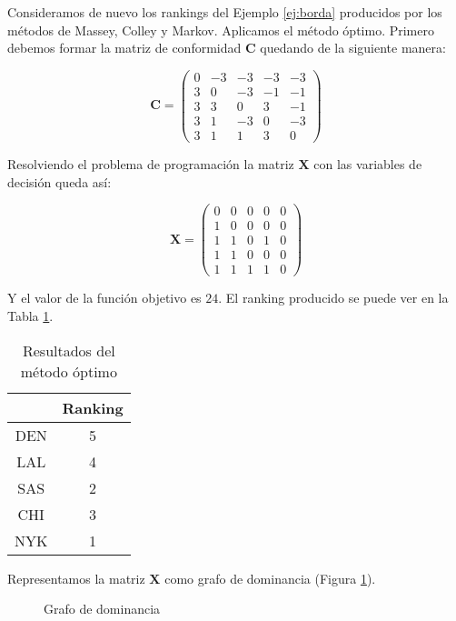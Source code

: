 \begin{ejemplo} \label{ej:optimo}
Consideramos de nuevo los rankings del Ejemplo \ref{ej:borda} producidos por los métodos de Massey, Colley y Markov. Aplicamos el método óptimo. Primero debemos formar la matriz de conformidad $\mathbf{C}$ quedando de la siguiente manera:

\begin{equation*}
\mathbf{C} = \left(\begin{array}{rrrrr}
0 & -3 & -3 & -3 & -3 \\
3 &  0 & -3 & -1 & -1 \\
3 &  3 &  0 &  3 & -1 \\
3 &  1 & -3 &  0 & -3 \\
3 &  1 &  1	&  3 &	0
\end{array}\right)
\end{equation*}

Resolviendo el problema de programación la matriz $\mathbf{X}$ con las variables de decisión queda así:

\begin{equation*}
\mathbf{X} = \left(\begin{array}{rrrrr}
0 & 0 & 0 & 0 & 0 \\
1 & 0 & 0 & 0 & 0 \\
1 & 1 & 0 & 1 & 0 \\
1 & 1 & 0 & 0 & 0 \\
1 & 1 & 1 & 1 &	0
\end{array}\right)
\end{equation*}

Y el valor de la función objetivo es $24$. El ranking producido se puede ver en la Tabla \ref{tbl:optimo_resultados}.

\begin{table}[h]
\centering
\caption{Resultados del método óptimo}
\label{tbl:optimo_resultados}
\begin{tabular}{@{}cc@{}}
\cmidrule(l){2-2}
    & Ranking \\ \midrule
DEN & 5       \\
LAL & 4       \\
SAS & 2       \\
CHI & 3       \\
NYK & 1       \\ \bottomrule
\end{tabular}
\end{table}

Representamos la matriz $\mathbf{X}$ como grafo de dominancia (Figura \ref{fig:ejemplo_grafo_dominancia_optimo}).

\begin{figure}[htb]
\centering
\ejemplografodominanciaoptimo
\caption{Grafo de dominancia}
\label{fig:ejemplo_grafo_dominancia_optimo}
\end{figure}

\end{ejemplo}

